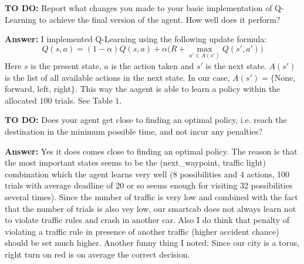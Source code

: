 \documentclass{article}
\begin{document}
\noindent\textbf{TO DO:} Report what changes you made to your basic implementation of Q-Learning to achieve the final version of the agent. How well does it perform?

\vspace{.2cm}

\noindent\textbf{Answer:} I implemented Q-Learning using the following update formula: 
$$Q(s,a)=(1-\alpha)Q(s,a)+\alpha\big(R+\max_{a'\in A(s')}Q(s',a')\big)$$
 Here $s$ is the present state, $a$ is the action taken and $s'$ is the next state. $A(s')$  is the list of all available actions in the next state. In our case, $A(s')=\{$None, forward, left, right$\}$. This way the aagent is able to learn a policy within the allocated $100$ trials. See Table $1$.

\vspace{.5cm}

\noindent\textbf{TO DO:} Does your agent get close to finding an optimal policy, i.e. reach the destination in the minimum possible time, and not incur any penalties?

\vspace{.2cm}

\noindent\textbf{Answer:} Yes it does comes close to finding an optimal policy. The reason  is that the most important states seems to be the (next\_waypoint, traffic light) combination which the agent learns very well (8 possibilities and 4 actions, 100 trials with average deadline of 20 or so seems enough for visiting 32 possibilities several times). Since the number of traffic is very low and combined with the fact that the number of trials is also vey low, our smartcab does not always learn not to violate traffic rules and crash in another car. Also I do think that penalty of violating a traffic rule in presence of another traffic (higher accident chance) should be set much higher. Another funny thing I noted: Since our city is a torus, right turn on red is on average the correct decision.
\end{document}
